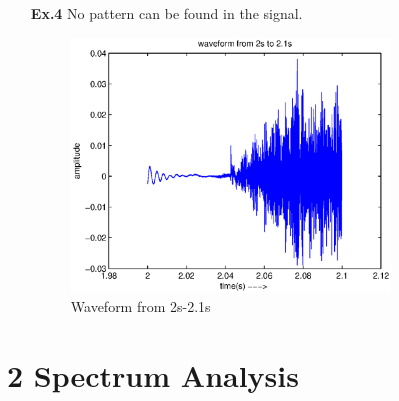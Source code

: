 \documentclass[a4paper]{article}
\begin{document}
\begin{enumerate}
\item[\textbf{Ex.4}] No pattern can be found in the signal.
\begin{figure}[H]
	\begin{center}
		\includegraphics[width=0.8\textwidth]{ex4.eps}
		\caption{Waveform from 2s-2.1s}\label{fig:wav2}		
	\end{center}
\end{figure}
\end{enumerate}

\section*{2 Spectrum Analysis}
\end{document}
